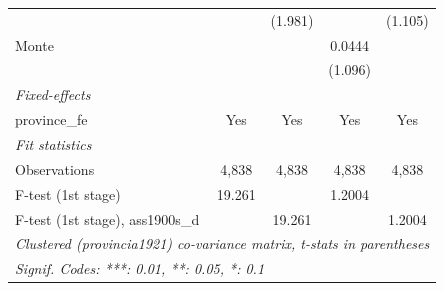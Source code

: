 \begin{table}[htbp]
\begin{tabular}{lcccc}
$$                                       &                        & (1.981)                       &                        & (1.105)\\   
      Monte                            &                        &                               & 0.0444                 &   \\   
                                       &                        &                               & (1.096)                &   \\   
      \midrule
      \emph{Fixed-effects}\\
      province\_fe                     & Yes                    & Yes                           & Yes                    & Yes\\  
      \midrule
      \emph{Fit statistics}\\
      Observations                     & 4,838                  & 4,838                         & 4,838                  & 4,838\\  
      F-test (1st stage)               & 19.261                 &                               & 1.2004                 & \\  
      F-test (1st stage), ass1900s\_d  &                        & 19.261                        &                        & 1.2004\\  
      \midrule \midrule
      \multicolumn{5}{l}{\emph{Clustered (provincia1921) co-variance matrix, t-stats in parentheses}}\\
      \multicolumn{5}{l}{\emph{Signif. Codes: ***: 0.01, **: 0.05, *: 0.1}}\\
   \end{tabular}
\end{table}


